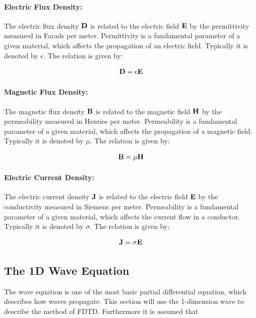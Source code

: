 \paragraph{Electric Flux Density:} The electric flux density $\bold{D}$ is related to the electric field $\bold{E}$ by the permittivity measured in Farads per meter. Permittivity is a fundamental parameter of a given material, which affects the propagation of an electric field. Typically it is denoted by $\epsilon$. The relation is given by\cite{taflove2000computional}: 

\begin{align}
  \bold{D} = \epsilon \bold{E}
\end{align}

\paragraph{Magnetic Flux Density:} The magnetic flux density $\bold{B}$ is related to the magnetic field $\bold{H}$ by the permeability measured in Henries per meter. Permeability is a fundamental parameter of a given material, which affects the propagation of a magnetic field. Typically it is denoted by $\mu$. The relation is given by\cite{taflove2000computional}: 

\begin{align}
  \bold{B} = \mu \bold{H}
\end{align}
\paragraph{Electric Current Density:}  The electric current density $\bold{J}$ is related to the electric field $\bold{E}$ by the conductivity measured in Siemens per meter. Permeability is a fundamental parameter of a given material, which affects the current flow in a conductor. Typically it is denoted by $\sigma$. The relation is given by\cite{taflove2000computional}: 

\begin{align}
  \bold{J} = \sigma \bold{E}
\end{align}

\subsection{The 1D Wave Equation}
The wave equation is one of the most basic partial differential equation, which describes how waves propagate. This section will use the 1-dimension wave to describe the method of FDTD. Furthermore it is assumed that

